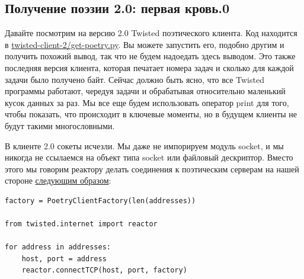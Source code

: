 \subsection{Получение поэзии 2.0: первая кровь.0}


Давайте посмотрим на версию 2.0 Twisted поэтического клиента. Код находится в 
\href{http://github.com/jdavisp3/twisted-intro/blob/master/twisted-client-2/get-poetry.py}{twisted-client-2/get-poetry.py}. 
Вы можете запустить его, подобно другим и получить похожий вывод, 
так что не будем надоедать здесь выводом. Это также последняя 
версия клиента, которая печатает номера задач и сколько для 
каждой задачи было получено байт. Сейчас должно быть ясно, что 
все Twisted программы работают, чередуя задачи и обрабатывая 
относительно маленький кусок данных за раз. Мы все еще будем 
использовать оператор print для того, чтобы показать, что происходит 
в ключевые моменты, но в будущем клиенты не будут такими многословными. 



В клиенте 2.0 сокеты исчезли. Мы даже не импорируем модуль socket, и 
мы никогда не ссылаемся на объект типа socket или файловый дескриптор. Вместо 
этого мы говорим реактору делать соединения к поэтическим 
серверам на нашей стороне  
\href{http://github.com/jdavisp3/twisted-intro/blob/master/twisted-client-2/get-poetry.py#L110}{следующим образом}:

\begin{scriptsize}\begin{verbatim}
factory = PoetryClientFactory(len(addresses))

from twisted.internet import reactor

for address in addresses:
    host, port = address
    reactor.connectTCP(host, port, factory)
\end{verbatim}\end{scriptsize}

